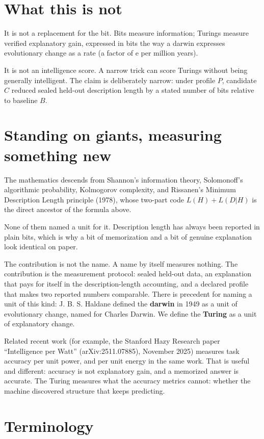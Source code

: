 \documentclass[11pt,letterpaper]{article}
\begin{document}
\section{What this is not}

It is not a replacement for the bit. Bits measure information; Turings measure verified explanatory gain, expressed in bits the way a darwin expresses evolutionary change as a rate (a factor of e per million years).

It is not an intelligence score. A narrow trick can score Turings without being generally intelligent. The claim is deliberately narrow: under profile $P$, candidate $C$ reduced sealed held-out description length by a stated number of bits relative to baseline $B$.

\section{Standing on giants, measuring something new}

The mathematics descends from Shannon's information theory, Solomonoff's algorithmic probability, Kolmogorov complexity, and Rissanen's Minimum Description Length principle (1978), whose two-part code $L(H) + L(D|H)$ is the direct ancestor of the formula above.

None of them named a unit for it. Description length has always been reported in plain bits, which is why a bit of memorization and a bit of genuine explanation look identical on paper.

The contribution is not the name. A name by itself measures nothing. The contribution is the measurement protocol: sealed held-out data, an explanation that pays for itself in the description-length accounting, and a declared profile that makes two reported numbers comparable. There is precedent for naming a unit of this kind: J. B. S. Haldane defined the \textbf{darwin} in 1949 as a unit of evolutionary change, named for Charles Darwin. We define the \textbf{Turing} as a unit of explanatory change.

Related recent work (for example, the Stanford Hazy Research paper ``Intelligence per Watt'' (arXiv:2511.07885), November 2025) measures task accuracy per unit power, and per unit energy in the same work. That is useful and different: accuracy is not explanatory gain, and a memorized answer is accurate. The Turing measures what the accuracy metrics cannot: whether the machine discovered structure that keeps predicting.

\section{Terminology}
\end{document}
